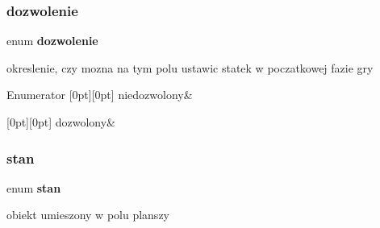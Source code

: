 \subsubsection{dozwolenie}
{\footnotesize\ttfamily enum \textbf{ dozwolenie}}



okreslenie, czy mozna na tym polu ustawic statek w poczatkowej fazie gry 

\begin{DoxyEnumFields}{Enumerator}
[0pt][0pt]{}\mbox{\label{struct_pole_planszy_a11e5d9d8d4cd509fab8200a06666c63aaee9f169a9c7cdb7d6a069bb65534b018}} 
niedozwolony&\\
\hline

[0pt][0pt]{}\mbox{\label{struct_pole_planszy_a11e5d9d8d4cd509fab8200a06666c63aac4b69100e88875f0de688afc9ac6e274}} 
dozwolony&\\
\hline

\end{DoxyEnumFields}
\mbox{\label{struct_pole_planszy_a22f12b54cfb8a7a9a70094a193a38dab}} 
\subsubsection{stan}
{\footnotesize\ttfamily enum \textbf{ stan}}



obiekt umieszony w polu planszy 

